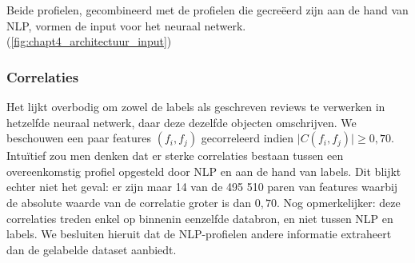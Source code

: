 Beide profielen, gecombineerd met de profielen die gecreëerd zijn aan de hand van NLP, vormen de input voor het neuraal netwerk. (\autoref{fig:chapt4_architectuur_input})


\subsubsection{Correlaties}
Het lijkt overbodig om zowel de labels als geschreven reviews te verwerken in hetzelfde neuraal netwerk, daar deze dezelfde objecten omschrijven. We beschouwen een paar features $(f_i, f_j)$ gecorreleerd indien $\lvert C(f_i, f_j) \rvert \ge 0,70$. Intuïtief zou men denken dat er sterke correlaties bestaan tussen een overeenkomstig profiel opgesteld door NLP en aan de hand van labels.\newline
Dit blijkt echter niet het geval: er zijn maar 14 van de 495 510 paren van features waarbij de absolute waarde van de correlatie groter is dan $0,70$. Nog opmerkelijker: deze correlaties treden enkel op binnenin eenzelfde databron, en niet tussen NLP en labels. We besluiten hieruit dat de NLP-profielen andere informatie extraheert dan de gelabelde dataset aanbiedt.

